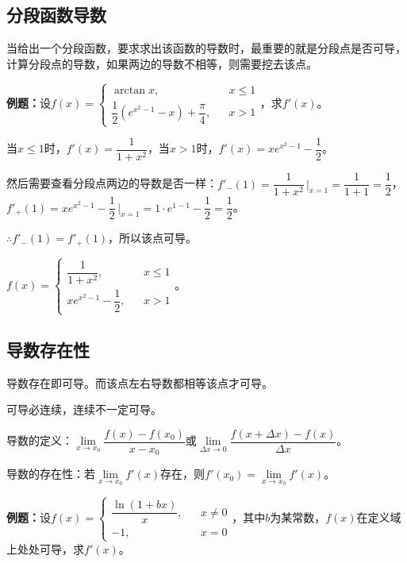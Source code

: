 \subsection{分段函数导数}

当给出一个分段函数，要求求出该函数的导数时，最重要的就是分段点是否可导，计算分段点的导数，如果两边的导数不相等，则需要挖去该点。\medskip

\textbf{例题：}设$f(x)=\left\{\begin{array}{lcl}
                              \arctan x,                                & & x\leqslant 1 \\
                              \dfrac{1}{2}(e^{x^2-1}-x)+\dfrac{\pi}{4}, & & x>1
\end{array}
\right.$，求$f'(x)$。

当$x\leqslant 1$时，$f'(x)=\dfrac{1}{1+x^2}$，当$x>1$时，$f'(x)=xe^{x^2-1}-\dfrac{1}{2}$。

然后需要查看分段点两边的导数是否一样：$f'_-(1)=\dfrac{1}{1+x^2}\,\bigg\vert_{x=1}=\dfrac{1}{1+1}=\dfrac{1}{2}$，$f'_+(1)=xe^{x^2-1}-\dfrac{1}{2}\,\bigg\vert_{x=1}=1\cdot e^{1-1}-\dfrac{1}{2}=\dfrac{1}{2}$。\medskip

$\therefore f'_-(1)=f'_+(1)$，所以该点可导。\medskip

$f(x)=\left\{\begin{array}{lcl}
                 \dfrac{1}{1+x^2},        & & x\leqslant 1 \\
                 xe^{x^2-1}-\dfrac{1}{2}, & & x>1
\end{array}
\right.$。

\subsection{导数存在性}

导数存在即可导。而该点左右导数都相等该点才可导。

可导必连续，连续不一定可导。

导数的定义：$\lim\limits_{x\to x_0}\dfrac{f(x)-f(x_0)}{x-x_0}$或$\lim\limits_{\Delta x\to 0}\dfrac{f(x+\Delta x)-f(x)}{\Delta x}$。

导数的存在性：若$\lim\limits_{x\to x_0}f'(x)$存在，则$f'(x_0)=\lim\limits_{x\to x_0}f'(x)$。\medskip

\textbf{例题：}设$f(x)=\left\{\begin{array}{lcl}
                              \dfrac{\ln(1+bx)}{x}, & & x\neq 0 \\
                              -1,                   & & x=0
\end{array}
\right.$，其中$b$为某常数，$f(x)$在定义域上处处可导，求$f'(x)$。


